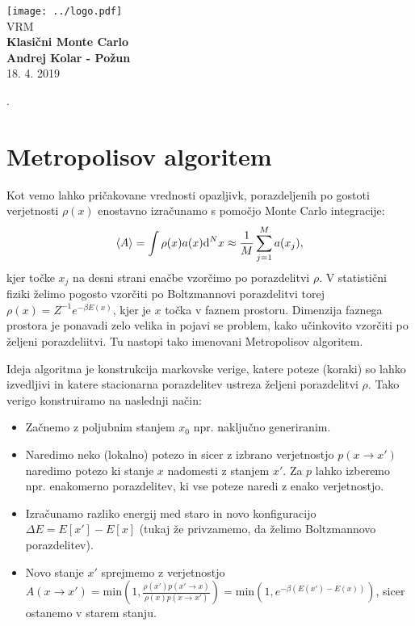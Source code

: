 \documentclass{article}
\begin{document}
\begin{titlepage}
    \begin{center}
        \vspace*{1cm}
        \Large
\texttt{[image: ../logo.pdf]}\\
        \Large
\vspace{1cm}
        VRM\\
        \huge
        \textbf{Klasični Monte Carlo\\}
\Large  
        \vspace{1cm}
        \textbf{Andrej Kolar - Po{\v z}un\\}
        \vspace{0.8cm}
 18. 4. 2019

\vfill
\normalsize
\end{center}. 
\end{titlepage}
\newpage
{}
\section*{Metropolisov algoritem}

Kot vemo lahko pričakovane vrednosti opazljivk, porazdeljenih po gostoti verjetnosti $\rho(x)$ enostavno izračunamo s pomočjo Monte Carlo integracije:
\begin{equation*}
\langle A \rangle = \int \rho(x) a(x) \textup{d}^N x \approx \frac{1}{M} \sum_{j=1}^M a(x_j),
\end{equation*}
kjer točke $x_j$ na desni strani enačbe vzorčimo po porazdelitvi $\rho$.
V statistični fiziki želimo pogosto vzorčiti po Boltzmannovi porazdelitvi torej $\rho(x) = Z^{-1} e^{-\beta E(x)}$, kjer je $x$ točka v faznem prostoru. Dimenzija faznega prostora je ponavadi zelo velika in pojavi se problem, kako učinkovito vzorčiti po željeni porazdeliitvi. Tu nastopi tako imenovani Metropolisov algoritem.

Ideja algoritma je konstrukcija markovske verige, katere poteze (koraki) so lahko izvedljivi in katere stacionarna porazdelitev ustreza željeni porazdelitvi $\rho$. Tako verigo konstruiramo na naslednji način:
\begin{itemize}
\item Začnemo z poljubnim stanjem $x_0$ npr. naključno generiranim.
\item Naredimo neko (lokalno) potezo in sicer z izbrano verjetnostjo $p(x \to x')$ naredimo potezo ki stanje $x$ nadomesti z stanjem $x'$. Za $p$ lahko izberemo npr. enakomerno porazdelitev, ki vse poteze naredi z enako verjetnostjo.
\item Izračunamo razliko energij med staro in novo konfiguracijo $\Delta E = E[x']-E[x]$ (tukaj že privzamemo, da želimo Boltzmannovo porazdelitev).
\item Novo stanje $x'$ sprejmemo z verjetnostjo $A(x \to x') = \mathrm{min} \left(1, \frac{\rho(x') p(x' \to x)}{\rho(x) p(x \to x')} \right) = \mathrm{min} \left(1, e^{-\beta (E(x')-E(x))}\right)$, sicer ostanemo v starem stanju.
\end{itemize}
\end{document}
